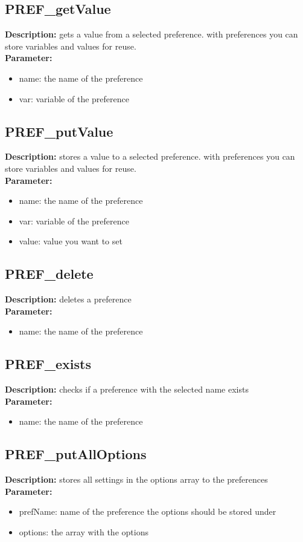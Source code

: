 \subsection{PREF\_getValue}
\textbf{Description:} gets a value from a selected preference. with preferences you can store variables and values for reuse.\\
\textbf{Parameter:}
\begin{itemize}
\item name: the name of the preference
\item var: variable of the preference
\end{itemize}

\subsection{PREF\_putValue}
\textbf{Description:} stores a value to a selected preference. with preferences you can store variables and values for reuse.\\
\textbf{Parameter:}
\begin{itemize}
\item name: the name of the preference
\item var: variable of the preference
\item value: value you want to set
\end{itemize}

\subsection{PREF\_delete}
\textbf{Description:} deletes a preference\\
\textbf{Parameter:}
\begin{itemize}
\item name: the name of the preference
\end{itemize}

\subsection{PREF\_exists}
\textbf{Description:} checks if a preference with the selected name exists\\
\textbf{Parameter:}
\begin{itemize}
\item name: the name of the preference
\end{itemize}

\subsection{PREF\_putAllOptions}
\textbf{Description:} stores all settings in the options array to the preferences\\
\textbf{Parameter:}
\begin{itemize}
\item prefName: name of the preference the options should be stored under
\item options: the array with the options
\end{itemize}

